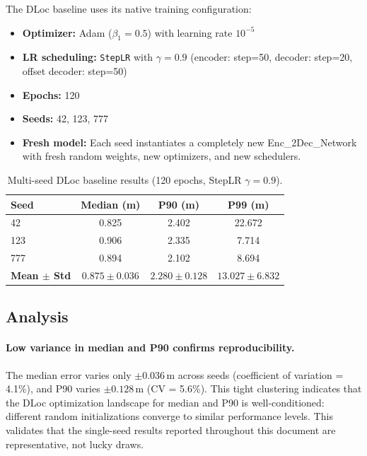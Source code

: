 \documentclass[11pt,a4paper]{article}
\begin{document}
The DLoc baseline uses its native training configuration:
\begin{itemize}[nosep]
  \item \textbf{Optimizer:} Adam ($\beta_1 = 0.5$) with learning rate $10^{-5}$
  \item \textbf{LR scheduling:} \texttt{StepLR} with $\gamma = 0.9$ (encoder: step=50, decoder: step=20, offset decoder: step=50)
  \item \textbf{Epochs:} 120
  \item \textbf{Seeds:} 42, 123, 777
  \item \textbf{Fresh model:} Each seed instantiates a completely new Enc\_2Dec\_Network with fresh random weights, new optimizers, and new schedulers.
\end{itemize}

\begin{table}[H]
\centering
\caption{Multi-seed DLoc baseline results (120 epochs, StepLR $\gamma = 0.9$).}
\label{tab:multiseed_baseline}
\begin{tabular}{@{}lccc@{}}
\toprule
\textbf{Seed} & \textbf{Median (m)} & \textbf{P90 (m)} & \textbf{P99 (m)} \\
\midrule
42  & 0.825 & 2.402 & 22.672 \\
123 & 0.906 & 2.335 &  7.714 \\
777 & 0.894 & 2.102 &  8.694 \\
\midrule
\textbf{Mean $\pm$ Std} & $\mathbf{0.875 \pm 0.036}$ & $\mathbf{2.280 \pm 0.128}$ & $\mathbf{13.027 \pm 6.832}$ \\
\bottomrule
\end{tabular}
\end{table}

\subsection{Analysis}

\paragraph{Low variance in median and P90 confirms reproducibility.}
The median error varies only $\pm 0.036$\,m across seeds (coefficient of variation = 4.1\%), and P90 varies $\pm 0.128$\,m (CV = 5.6\%).
This tight clustering indicates that the DLoc optimization landscape for median and P90 is well-conditioned: different random initializations converge to similar performance levels.
This validates that the single-seed results reported throughout this document are representative, not lucky draws.
\end{document}
